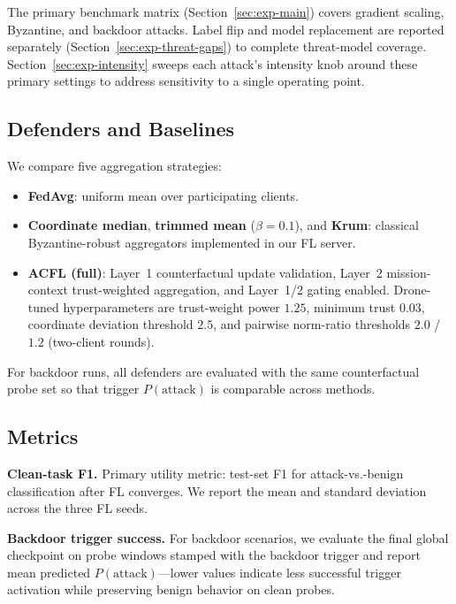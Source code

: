 The primary benchmark matrix (Section~\ref{sec:exp-main}) covers gradient scaling, Byzantine, and backdoor attacks.
Label flip and model replacement are reported separately (Section~\ref{sec:exp-threat-gaps}) to complete threat-model coverage.
Section~\ref{sec:exp-intensity} sweeps each attack's intensity knob around these primary settings to address sensitivity to a single operating point.

\subsection{Defenders and Baselines}
\label{sec:exp-defenders}

We compare five aggregation strategies:

\begin{itemize}
  \item \textbf{FedAvg}: uniform mean over participating clients.
  \item \textbf{Coordinate median}, \textbf{trimmed mean} ($\beta{=}0.1$), and \textbf{Krum}: classical Byzantine-robust aggregators implemented in our FL server.
  \item \textbf{ACFL (full)}: Layer~1 counterfactual update validation, Layer~2 mission-context trust-weighted aggregation, and Layer~1/2 gating enabled.
  Drone-tuned hyperparameters are trust-weight power $1.25$, minimum trust $0.03$, coordinate deviation threshold $2.5$, and pairwise norm-ratio thresholds $2.0$ / $1.2$ (two-client rounds).
\end{itemize}

For backdoor runs, all defenders are evaluated with the same counterfactual probe set so that trigger $P(\text{attack})$ is comparable across methods.

\subsection{Metrics}
\label{sec:exp-metrics}

\textbf{Clean-task F1.} Primary utility metric: test-set F1 for attack-vs.-benign classification after FL converges.
We report the mean and standard deviation across the three FL seeds.

\textbf{Backdoor trigger success.} For backdoor scenarios, we evaluate the final global checkpoint on probe windows stamped with the backdoor trigger and report mean predicted $P(\text{attack})$---lower values indicate less successful trigger activation while preserving benign behavior on clean probes.

